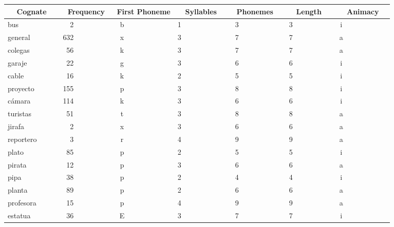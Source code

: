 %
\setlongtables
\begin{longtable}{|l|c|c|c|c|c|c|}
\hline
\multicolumn{1}{|c|}{Cognate}&\multicolumn{1}{c|}{Frequency}&\multicolumn{1}{c|}{First Phoneme}&\multicolumn{1}{c|}{Syllables}&\multicolumn{1}{c|}{Phonemes}&\multicolumn{1}{c|}{Length}&\multicolumn{1}{c|}{Animacy}\\ \hline
\endhead
\hline\endfoot
bus~~~~~~~~~~&~~2~~~~~~~~~~&b~~~~~~~~~~~~&1~~~~~~~~~~~~&~3~~~~~~~~~~~&~3~~~~~~~~~~~&i~~~~~~~~~~~~\\ 
general~~~~~~&632~~~~~~~~~~&x~~~~~~~~~~~~&3~~~~~~~~~~~~&~7~~~~~~~~~~~&~7~~~~~~~~~~~&a~~~~~~~~~~~~\\ 
colegas~~~~~~&~56~~~~~~~~~~&k~~~~~~~~~~~~&3~~~~~~~~~~~~&~7~~~~~~~~~~~&~7~~~~~~~~~~~&a~~~~~~~~~~~~\\ 
garaje~~~~~~~&~22~~~~~~~~~~&g~~~~~~~~~~~~&3~~~~~~~~~~~~&~6~~~~~~~~~~~&~6~~~~~~~~~~~&i~~~~~~~~~~~~\\ 
cable~~~~~~~~&~16~~~~~~~~~~&k~~~~~~~~~~~~&2~~~~~~~~~~~~&~5~~~~~~~~~~~&~5~~~~~~~~~~~&i~~~~~~~~~~~~\\ 
proyecto~~~~~&155~~~~~~~~~~&p~~~~~~~~~~~~&3~~~~~~~~~~~~&~8~~~~~~~~~~~&~8~~~~~~~~~~~&i~~~~~~~~~~~~\\ 
c\'{a}mara~~~~~~~&114~~~~~~~~~~&k~~~~~~~~~~~~&3~~~~~~~~~~~~&~6~~~~~~~~~~~&~6~~~~~~~~~~~&i~~~~~~~~~~~~\\ 
turistas~~~~~&~51~~~~~~~~~~&t~~~~~~~~~~~~&3~~~~~~~~~~~~&~8~~~~~~~~~~~&~8~~~~~~~~~~~&a~~~~~~~~~~~~\\ 
jirafa~~~~~~~&~~2~~~~~~~~~~&x~~~~~~~~~~~~&3~~~~~~~~~~~~&~6~~~~~~~~~~~&~6~~~~~~~~~~~&a~~~~~~~~~~~~\\ 
reportero~~~~&~~3~~~~~~~~~~&r~~~~~~~~~~~~&4~~~~~~~~~~~~&~9~~~~~~~~~~~&~9~~~~~~~~~~~&a~~~~~~~~~~~~\\ 
plato~~~~~~~~&~85~~~~~~~~~~&p~~~~~~~~~~~~&2~~~~~~~~~~~~&~5~~~~~~~~~~~&~5~~~~~~~~~~~&i~~~~~~~~~~~~\\ 
pirata~~~~~~~&~12~~~~~~~~~~&p~~~~~~~~~~~~&3~~~~~~~~~~~~&~6~~~~~~~~~~~&~6~~~~~~~~~~~&a~~~~~~~~~~~~\\ 
pipa~~~~~~~~~&~38~~~~~~~~~~&p~~~~~~~~~~~~&2~~~~~~~~~~~~&~4~~~~~~~~~~~&~4~~~~~~~~~~~&i~~~~~~~~~~~~\\ 
planta~~~~~~~&~89~~~~~~~~~~&p~~~~~~~~~~~~&2~~~~~~~~~~~~&~6~~~~~~~~~~~&~6~~~~~~~~~~~&a~~~~~~~~~~~~\\ 
profesora~~~~&~15~~~~~~~~~~&p~~~~~~~~~~~~&4~~~~~~~~~~~~&~9~~~~~~~~~~~&~9~~~~~~~~~~~&a~~~~~~~~~~~~\\ 
estatua~~~~~~&~36~~~~~~~~~~&E~~~~~~~~~~~~&3~~~~~~~~~~~~&~7~~~~~~~~~~~&~7~~~~~~~~~~~&i~~~~~~~~~~~~\\ 

\end{longtable}
